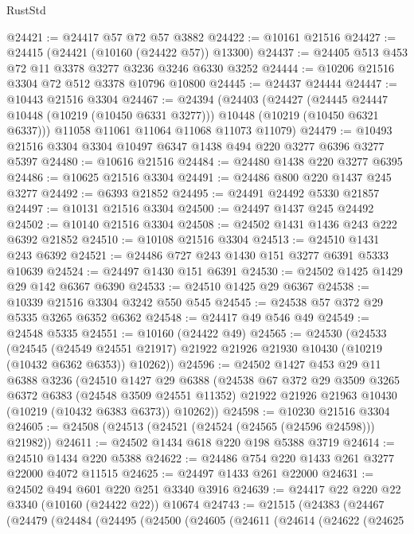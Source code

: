 \begin{lexlean}{RustStd}
\begin{coremodule}
@24421 := @24417 @57 @72 @57 @3882
@24422 := @10161 @21516
@24427 := @24415 (@24421 (@10160 (@24422 @57)) @13300)
@24437 := @24405 @513 @453 @72 @11 @3378 @3277 @3236 @3246 @6330 @3252
@24444 := @10206 @21516 @3304 @72 @512 @3378 @10796 @10800
@24445 := @24437 @24444
@24447 := @10443 @21516 @3304
@24467 := @24394
    (@24403
      (@24427
        (@24445 @24447 @10448 (@10219 (@10450 @6331 @3277)))
        @10448
        (@10219 (@10450 @6321 @6337)))
      @11058
      @11061
      @11064
      @11068
      @11073
      @11079)
@24479 := @10493 @21516 @3304 @3304 @10497 @6347 @1438 @494 @220 @3277 @6396 @3277 @5397
@24480 := @10616 @21516
@24484 := @24480 @1438 @220 @3277 @6395
@24486 := @10625 @21516 @3304
@24491 := @24486 @800 @220 @1437 @245 @3277
@24492 := @6393 @21852
@24495 := @24491 @24492 @5330 @21857
@24497 := @10131 @21516 @3304
@24500 := @24497 @1437 @245 @24492
@24502 := @10140 @21516 @3304
@24508 := @24502 @1431 @1436 @243 @222 @6392 @21852
@24510 := @10108 @21516 @3304
@24513 := @24510 @1431 @243 @6392
@24521 := @24486 @727 @243 @1430 @151 @3277 @6391 @5333 @10639
@24524 := @24497 @1430 @151 @6391
@24530 := @24502 @1425 @1429 @29 @142 @6367 @6390
@24533 := @24510 @1425 @29 @6367
@24538 := @10339 @21516 @3304 @3242 @550 @545
@24545 := @24538 @57 @372 @29 @5335 @3265 @6352 @6362
@24548 := @24417 @49 @546 @49
@24549 := @24548 @5335
@24551 := @10160 (@24422 @49)
@24565 := @24530
    (@24533
      (@24545
        (@24549 @24551 @21917)
        @21922
        @21926
        @21930
        @10430
        (@10219 (@10432 @6362 @6353))
        @10262))
@24596 := @24502
    @1427
    @453
    @29
    @11
    @6388
    @3236
    (@24510
      @1427
      @29
      @6388
      (@24538
        @67
        @372
        @29
        @3509
        @3265
        @6372
        @6383
        (@24548 @3509 @24551 @11352)
        @21922
        @21926
        @21963
        @10430
        (@10219 (@10432 @6383 @6373))
        @10262))
@24598 := @10230 @21516 @3304
@24605 := @24508 (@24513 (@24521 (@24524 (@24565 (@24596 @24598))) @21982))
@24611 := @24502 @1434 @618 @220 @198 @5388 @3719
@24614 := @24510 @1434 @220 @5388
@24622 := @24486 @754 @220 @1433 @261 @3277 @22000 @4072 @11515
@24625 := @24497 @1433 @261 @22000
@24631 := @24502 @494 @601 @220 @251 @3340 @3916
@24639 := @24417 @22 @220 @22 @3340 (@10160 (@24422 @22)) @10674
@24743 := @21515
    (@24383
      (@24467
        (@24479
          (@24484
            (@24495
              (@24500
                (@24605
                  (@24611
                    (@24614
                      (@24622
                        (@24625

\end{coremodule}
\end{lexlean}
